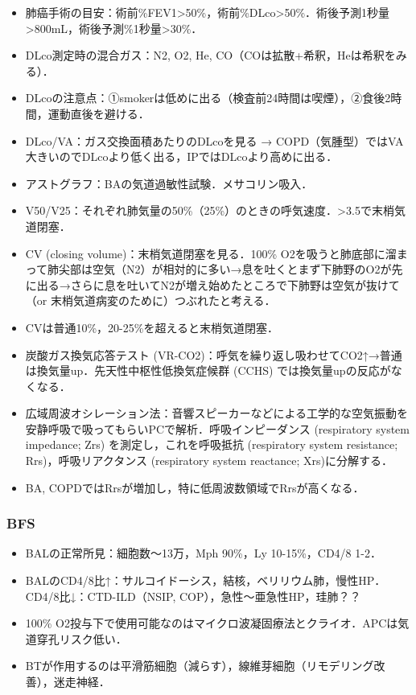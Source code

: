 \begin{itemize}
\item 肺癌手術の目安：術前\%FEV1>50\%，術前\%DLco>50\%．術後予測1秒量>800mL，術後予測\%1秒量>30\%．
\item DLco測定時の混合ガス：N2, O2, He, CO（COは拡散+希釈，Heは希釈をみる）．
\item DLcoの注意点：①smokerは低めに出る（検査前24時間は喫煙），②食後2時間，運動直後を避ける．
\item DLco/VA：ガス交換面積あたりのDLcoを見る → COPD（気腫型）ではVA大きいのでDLcoより低く出る，IPではDLcoより高めに出る．
\item アストグラフ：BAの気道過敏性試験．メサコリン吸入．
\item V50/V25：それぞれ肺気量の50\%（25\%）のときの呼気速度．>3.5で末梢気道閉塞．
\item CV (closing volume)：末梢気道閉塞を見る．100\% O2を吸うと肺底部に溜まって肺尖部は空気（N2）が相対的に多い→息を吐くとまず下肺野のO2が先に出る→さらに息を吐いてN2が増え始めたところで下肺野は空気が抜けて（or 末梢気道病変のために）つぶれたと考える．\item CVは普通10\%，20-25\%を超えると末梢気道閉塞．
\item 炭酸ガス換気応答テスト (VR-CO2)：呼気を繰り返し吸わせてCO2↑→普通は換気量up．先天性中枢性低換気症候群 (CCHS) では換気量upの反応がなくなる．
\item 広域周波オシレーション法：音響スピーカーなどによる工学的な空気振動を安静呼吸で吸ってもらいPCで解析．呼吸インピーダンス (respiratory system impedance; Zrs) を測定し，これを呼吸抵抗 (respiratory system resistance; Rrs)，呼吸リアクタンス (respiratory system reactance; Xrs)に分解する．
\item BA, COPDではRrsが増加し，特に低周波数領域でRrsが高くなる．
\end{itemize}


\subsubsection{BFS}

\begin{itemize}
\item BALの正常所見：細胞数〜13万，Mph 90\%，Ly 10-15\%，CD4/8 1-2．
\item BALのCD4/8比↑：サルコイドーシス，結核，ベリリウム肺，慢性HP．CD4/8比↓：CTD-ILD（NSIP, COP），急性〜亜急性HP，珪肺？？
\item 100\% O2投与下で使用可能なのはマイクロ波凝固療法とクライオ．APCは気道穿孔リスク低い．
\item BTが作用するのは平滑筋細胞（減らす），線維芽細胞（リモデリング改善），迷走神経．
\end{itemize}


